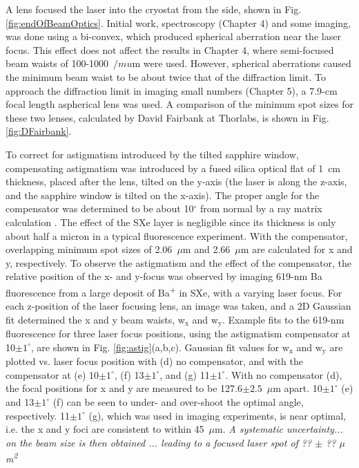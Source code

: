 A lens focused the laser into the cryostat from the side, shown in Fig. \ref{fig:endOfBeamOptics}.  Initial work, spectroscopy (Chapter 4) and some imaging, was done using a bi-convex, which produced spherical aberration near the laser focus.  This effect does not affect the results in Chapter 4, where semi-focused beam waists of 100-1000~$/mu$m were used.  However, spherical aberrations caused the minimum beam waist to be about twice that of the diffraction limit.  To approach the diffraction limit in imaging small numbers (Chapter 5), a 7.9-cm focal length aspherical lens was used.  A comparison of the minimum spot sizes for these two lenses, calculated by David Fairbank at Thorlabs, is shown in Fig. \ref{fig:DFairbank}.

To correct for astigmatism introduced by the tilted sapphire window, compensating astigmatism was introduced by a fused silica optical flat of 1~cm thickness, placed after the lens, tilted on the y-axis (the laser is along the z-axis, and the sapphire window is tilted on the x-axis).  The proper angle for the compensator was determined to be about 10$^{\circ}$ from normal by a ray matrix calculation \cite{raymatrix}.  The effect of the SXe layer is negligible since its thickness is only about half a micron in a typical fluorescence experiment.  With the compensator, overlapping minimum spot sizes of 2.06~$\mu$m and 2.66~$\mu$m are calculated for x and y, respectively.  To observe the astigmatism and the effect of the compensator, the relative position of the x- and y-focus was observed by imaging 619-nm Ba fluorescence from a large deposit of Ba\textsuperscript{+} in SXe, with a varying laser focus.  For each z-position of the laser focusing lens, an image was taken, and a 2D Gaussian fit determined the x and y beam waists, w$_{\text{x}}$ and w$_{\text{y}}$.  Example fits to the 619-nm fluorescence for three laser focus positions, using the astigmatism compensator at 10$\pm 1^{\circ}$, are shown in Fig. \ref{fig:astig}(a,b,c).  Gaussian fit values for w$_{\text{x}}$ and w$_{\text{y}}$ are plotted vs. laser focus position with (d) no compensator, and with the compensator at (e) 10$\pm 1^{\circ}$, (f) 13$\pm 1^{\circ}$, and (g) 11$\pm 1^{\circ}$.  With no compensator (d), the focal positions for x and y are measured to be 127.6$ \pm 2.5$~$\mu$m apart.  10$\pm 1^{\circ}$ (e) and 13$\pm 1^{\circ}$ (f) can be seen to under- and over-shoot the optimal angle, respectively.  11$\pm 1^{\circ}$ (g), which was used in imaging experiments, is near optimal, i.e. the x and y foci are consistent to within 45~$\mu$m.  \emph{\color{gray}A systematic uncertainty... on the beam size is then obtained ... leading to a focused laser spot of ?? $\pm$ ?? $\mu$m\textsuperscript{2}}

